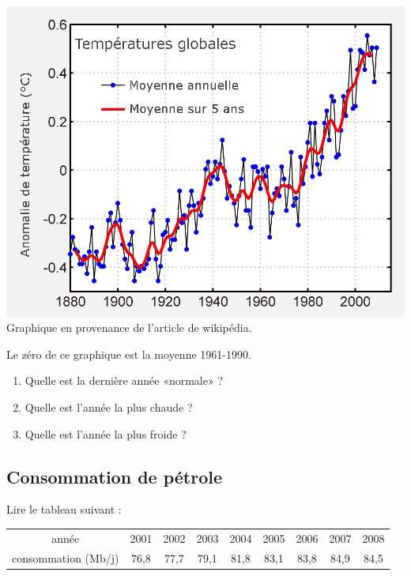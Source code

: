 \includegraphics[width=17cm]{Instrumental_Temperature_Record_fr.png}
Graphique en provenance de l'article  de wikipédia.

Le zéro de ce graphique est la moyenne 1961-1990.

\begin{enumerate}
    \item
        Quelle est la dernière année «normale» ?
    \item
        Quelle est l'année la plus chaude ?
    \item
        Quelle est l'année la plus froide ?
\end{enumerate}

\subsection{Consommation de pétrole}

Lire le tableau suivant :
\begin{center}
\begin{tabular}[h]{|c|c|c|c|c|c|c|c|c|}
année&
2001&
2002&
2003&
2004&
2005&
2006&
2007&
2008\\
consommation (Mb/j)&
76,8&
77,7&
79,1&
81,8&
83,1&
83,8&
84,9&
84,5
\end{tabular}
\end{center}

